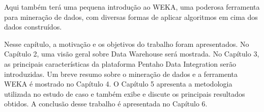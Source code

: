 Aqui também terá uma pequena introdução ao WEKA, uma poderosa ferramenta para mineração de dados, com diversas formas de aplicar algoritmos em cima dos dados construídos.

Nesse capítulo, a motivação e os objetivos do trabalho foram apresentados. No Capítulo 2, uma visão geral sobre Data Warehouse será mostrada. No Capítulo 3, as principais características da plataforma Pentaho Data Integration serão introduzidas. Um breve resumo sobre o mineração de dados e a ferramenta WEKA é mostrado no Capítulo 4. O Capítulo 5 apresenta a metodologia utilizada no estudo de caso e também exibe e discute os principais resultados obtidos. A conclusão desse trabalho é apresentada no Capítulo 6.